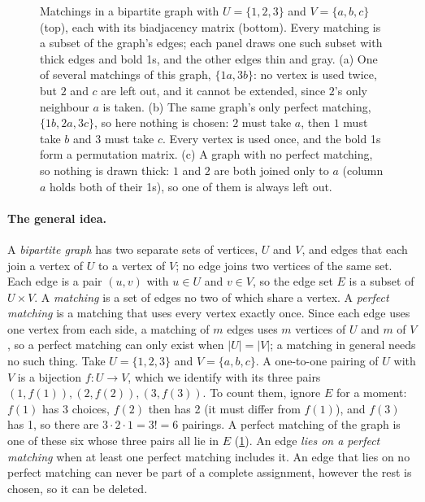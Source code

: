 \documentclass[11pt]{article}
\theoremstyle{definition}
\theoremstyle{plain}
\begin{document}
\begin{figure}[H]
\caption{Matchings in a bipartite graph with $U=\{1,2,3\}$ and $V=\{a,b,c\}$ (top), each with its biadjacency
matrix (bottom). Every matching is a subset of the graph's edges; each panel draws one such subset with thick edges
and bold 1s, and the other edges thin and gray. (a) One of several matchings of this graph, $\{1a,3b\}$: no vertex is
used twice, but $2$ and $c$ are left out, and it cannot be extended, since $2$'s only neighbour $a$ is taken. (b) The
same graph's only perfect matching, $\{1b,2a,3c\}$, so here nothing is chosen: $2$ must take $a$, then $1$ must take
$b$ and $3$ must take $c$. Every vertex is used once, and the bold 1s form a permutation matrix. (c) A graph with no
perfect matching, so nothing is drawn thick: $1$ and $2$ are both joined only to $a$ (column $a$ holds both of their
1s), so one of them is always left out.}
\label{fig:matching}
\end{figure}

\paragraph{The general idea.} A \emph{bipartite graph} has two separate sets of vertices, $U$ and $V$, and edges
that each join a vertex of $U$ to a vertex of $V$; no edge joins two vertices of the same set. Each edge is a pair
$(u,v)$ with $u\in U$ and $v\in V$, so the edge set $E$ is a subset of $U\times V$. A \emph{matching} is a set of edges
no two of which share a vertex. A \emph{perfect matching} is a matching that uses every vertex exactly once. Since each
edge uses one vertex from each side, a matching of $m$ edges uses $m$ vertices of $U$ and $m$ of $V$, so a perfect
matching can only exist when $|U|=|V|$; a matching in general needs no such thing. Take $U=\{1,2,3\}$ and
$V=\{a,b,c\}$. A one-to-one pairing of $U$ with $V$ is a bijection $f\colon U\to V$, which we identify with its three
pairs $(1,f(1)),(2,f(2)),(3,f(3))$. To count them, ignore $E$ for a moment: $f(1)$ has 3 choices, $f(2)$ then has 2 (it
must differ from $f(1)$), and $f(3)$ has 1, so there are $3\cdot 2\cdot 1=3!=6$ pairings. A perfect matching of the
graph is one of these six whose three pairs all lie in $E$ (\cref{fig:matching}). An edge \emph{lies on a perfect
matching} when at least one perfect matching includes it. An edge that lies on no perfect matching can never be part
of a complete assignment, however the rest is chosen, so it can be deleted.
\end{document}
